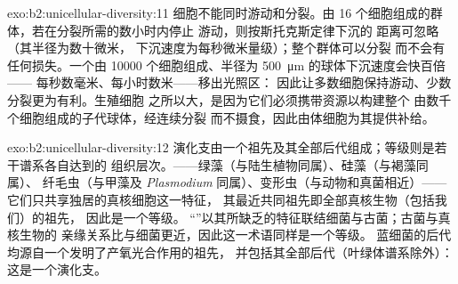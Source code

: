 \begin{solution}{exo:b2:unicellular-diversity:11}
细胞不能同时游动和分裂。由 16 个细胞组成的群体，若在分裂所需的数小时内停止
游动，则按斯托克斯定律下沉的
距离可忽略（其半径为数十微米，
下沉速度为每秒微米量级）；整个群体可以分裂
而不会有任何损失。一个由 \num{10000} 个细胞组成、半径为
\qty{500}{\micro m} 的球体下沉速度会快百倍——
每秒数毫米、每小时数米——移出光照区：
因此让多数细胞保持游动、少数分裂更为有利。生殖细胞
之所以大，是因为它们必须携带资源以构建整个
由数千个细胞组成的子代球体，经连续分裂
而不摄食，因此由体细胞为其提供补给。
\end{solution}

\begin{solution}{exo:b2:unicellular-diversity:12}
演化支由一个祖先及其全部后代组成；等级则是若干谱系各自达到的
组织层次。——绿藻（与陆生植物同属）、硅藻（与褐藻同属）、
纤毛虫（与甲藻及 \emph{Plasmodium} 同属）、变形虫（与动物和真菌相近）——
它们只共享独居的真核细胞这一特征，
其最近共同祖先即全部真核生物（包括我们）的祖先，
因此是一个等级。
“”以其所缺乏的特征联结细菌与古菌；古菌与真核生物的
亲缘关系比与细菌更近，因此这一术语同样是一个等级。
蓝细菌的后代均源自一个发明了产氧光合作用的祖先，
并包括其全部后代（叶绿体谱系除外）：
这是一个演化支。
\end{solution}

